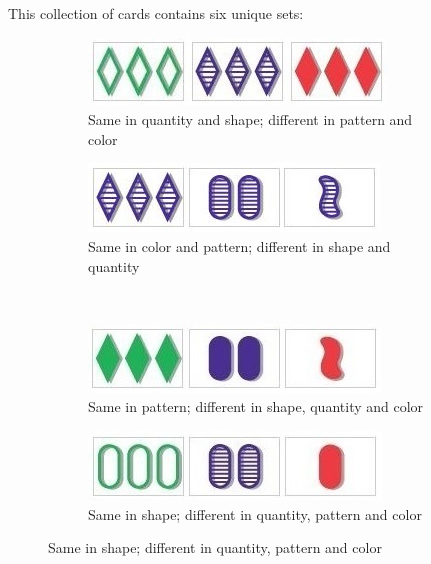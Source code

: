 \begin{problem}
This collection of cards contains six unique sets:
\begin{figure}[H] %
\captionsetup[subfigure]{justification=centering}
\centering
\begin{subfigure}{.47\textwidth}
    \centering
    \includegraphics[width=\linewidth]{figures/set1.jpg}
    \caption{Same in quantity and shape; different in pattern and color}
\end{subfigure}
%
\begin{subfigure}{.47\textwidth}
    \centering
    \includegraphics[width=\linewidth]{figures/set6.jpg}
    \caption{Same in color and pattern; different in shape and quantity}
\end{subfigure}
\\
\begin{subfigure}{.47\textwidth}
    \centering
    \includegraphics[width=\linewidth]{figures/set2.jpg}
    \caption{Same in pattern; different in shape, quantity and color}
\end{subfigure}
%
\begin{subfigure}{.47\textwidth}
    \centering
    \includegraphics[width=\linewidth]{figures/set3.jpg}
    \caption{Same in shape; different in quantity, pattern and color}

\end{subfigure}
\end{figure}
\end{problem}
